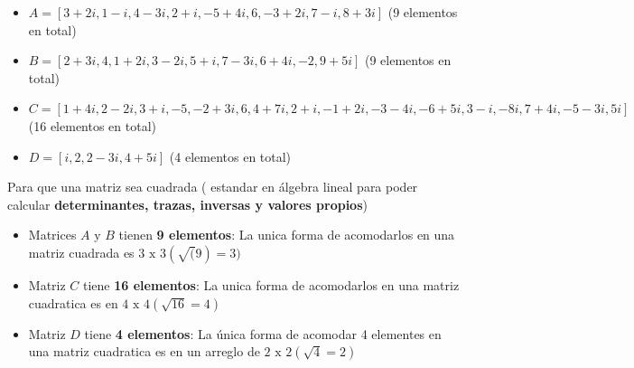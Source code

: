\documentclass[11pt]{article}
\providecommand{\tightlist}{%
      \setlength{\itemsep}{0pt}\setlength{\parskip}{0pt}}
\begin{document}
\begin{itemize}
\tightlist
\item
  \(A = [3+2i , 1-i , 4-3i , 2+i , -5+4i , 6 , -3+2i , 7-i , 8+3i]\) (9
  elementos en total)
\item
  \(B = [2+3i , 4 , 1+2i , 3-2i , 5+i , 7-3i , 6+4i , -2 , 9+5i]\) (9
  elementos en total)
\item
  \(C = [1+4i , 2-2i , 3+i , -5 , -2+3i , 6 , 4+7i , 2+i , -1+2i , -3-4i , -6+5i , 3-i , -8i , 7+4i , -5-3i , 5i]\)
  (16 elementos en total)
\item
  \(D = [i , 2 , 2-3i , 4+5i]\) (4 elementos en total)
\end{itemize}

Para que una matriz sea cuadrada ( estandar en álgebra lineal para poder
calcular \textbf{determinantes, trazas, inversas y valores propios})

\begin{itemize}
\tightlist
\item
  Matrices \textbf{\(A \text{ y } B\)} tienen \textbf{9 elementos}: La
  unica forma de acomodarlos en una matriz cuadrada es
  \(3 \text{ x } 3(\sqrt(9) = 3)\)
\item
  Matriz \(C\) tiene \textbf{16 elementos}: La unica forma de
  acomodarlos en una matriz cuadratica es en
  \(4 \text{ x } 4 (\sqrt{16} = 4)\)
\item
  Matriz \(D\) tiene \textbf{4 elementos}: La única forma de acomodar 4
  elementes en una matriz cuadratica es en un arreglo de
  \(2 \text { x } 2 (\sqrt{4} = 2)\)
\end{itemize}
\end{document}
